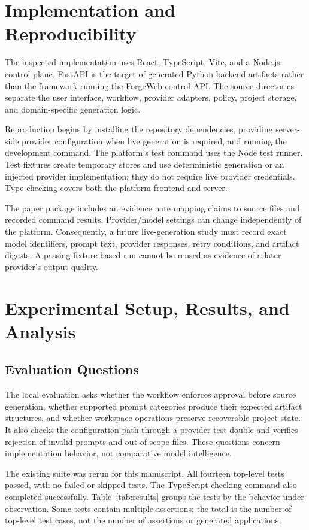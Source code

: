 \documentclass[conference,a4paper]{IEEEtran}
\begin{document}
\section{Implementation and Reproducibility}
The inspected implementation uses React, TypeScript, Vite, and a Node.js control plane. FastAPI is the target of generated Python backend artifacts rather than the framework running the ForgeWeb control API. The source directories separate the user interface, workflow, provider adapters, policy, project storage, and domain-specific generation logic.

Reproduction begins by installing the repository dependencies, providing server-side provider configuration when live generation is required, and running the development command. The platform's test command uses the Node test runner. Test fixtures create temporary stores and use deterministic generation or an injected provider implementation; they do not require live provider credentials. Type checking covers both the platform frontend and server.

The paper package includes an evidence note mapping claims to source files and recorded command results. Provider/model settings can change independently of the platform. Consequently, a future live-generation study must record exact model identifiers, prompt text, provider responses, retry conditions, and artifact digests. A passing fixture-based run cannot be reused as evidence of a later provider's output quality.

\section{Experimental Setup, Results, and Analysis}
\subsection{Evaluation Questions}
The local evaluation asks whether the workflow enforces approval before source generation, whether supported prompt categories produce their expected artifact structures, and whether workspace operations preserve recoverable project state. It also checks the configuration path through a provider test double and verifies rejection of invalid prompts and out-of-scope files. These questions concern implementation behavior, not comparative model intelligence.

The existing suite was rerun for this manuscript. All fourteen top-level tests passed, with no failed or skipped tests. The TypeScript checking command also completed successfully. Table~\ref{tab:results} groups the tests by the behavior under observation. Some tests contain multiple assertions; the total is the number of top-level test cases, not the number of assertions or generated applications.
\end{document}

